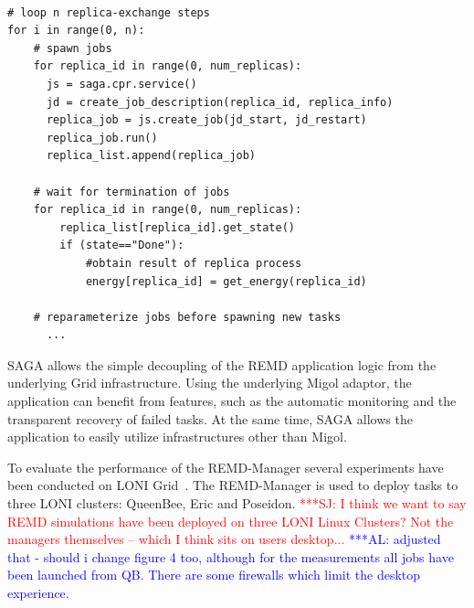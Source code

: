 \documentclass[times, 10pt, twocolumn]{article}
\newcommand{\alnote}[1]{ {\textcolor{blue} { ***AL: #1 }}}
\newcommand{\jhanote}[1]{ {\textcolor{red} { ***SJ: #1 }}}
\newcommand{\alnote}[1]{}
\newcommand{\jhanote}[1]{}
\newcommand{\up}{\vspace*{-1em}}
\begin{document}
\begin{lstlisting}[style=myPythonListing, float=t, caption={\small \bf REMD-Manager: Replica Orchestration}, 
label={lst:python_saga_chkpt_reg}]

# loop n replica-exchange steps  
for i in range(0, n):     
    # spawn jobs
    for replica_id in range(0, num_replicas):
      js = saga.cpr.service()
      jd = create_job_description(replica_id, replica_info)    
      replica_job = js.create_job(jd_start, jd_restart)
      replica_job.run()
      replica_list.append(replica_job)
     
    # wait for termination of jobs
    for replica_id in range(0, num_replicas):     
        replica_list[replica_id].get_state()
        if (state=="Done"):                          
            #obtain result of replica process
            energy[replica_id] = get_energy(replica_id)
 
    # reparameterize jobs before spawning new tasks      
      ...                    
\end{lstlisting}     

SAGA allows the simple decoupling of the REMD application logic from the underlying Grid infrastructure. 
Using the underlying Migol adaptor, the application can benefit from features, such as the  automatic monitoring
and the transparent recovery of failed tasks. At the same time, SAGA allows the application to easily utilize 
infrastructures other than Migol.




\label{sec:exp}       
        
\up
To evaluate the performance of the REMD-Manager several experiments
have been conducted on LONI Grid~\cite{Allen:2003xy}. The REMD-Manager
is used to deploy tasks to three LONI clusters: QueenBee,
Eric and Poseidon. 
\jhanote{I think we want to say REMD simulations
have been deployed on three LONI Linux Clusters? Not the managers
 themselves -- which I think sits on users desktop...} 
\alnote{adjusted that - should i change figure 4 too, 
although for the measurements all jobs have been launched from QB. There are 
some firewalls which limit the desktop experience.} 
 
\end{document}
